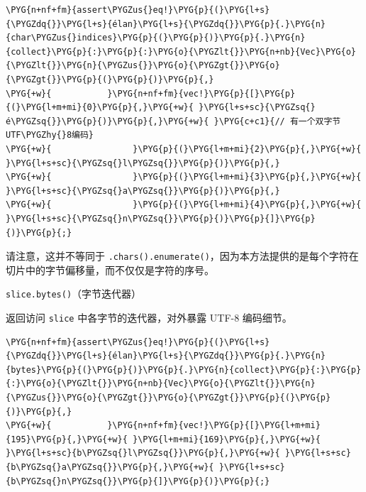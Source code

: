 \begin{Verbatim}[commandchars=\\\{\},breaklines=true,breakanywhere=true,fontsize=\codefont,xleftmargin=17bp]
\PYG{n+nf+fm}{assert\PYGZus{}eq!}\PYG{p}{(}\PYG{l+s}{\PYGZdq{}}\PYG{l+s}{élan}\PYG{l+s}{\PYGZdq{}}\PYG{p}{.}\PYG{n}{char\PYGZus{}indices}\PYG{p}{(}\PYG{p}{)}\PYG{p}{.}\PYG{n}{collect}\PYG{p}{:}\PYG{p}{:}\PYG{o}{\PYGZlt{}}\PYG{n+nb}{Vec}\PYG{o}{\PYGZlt{}}\PYG{n}{\PYGZus{}}\PYG{o}{\PYGZgt{}}\PYG{o}{\PYGZgt{}}\PYG{p}{(}\PYG{p}{)}\PYG{p}{,}
\PYG{+w}{           }\PYG{n+nf+fm}{vec!}\PYG{p}{[}\PYG{p}{(}\PYG{l+m+mi}{0}\PYG{p}{,}\PYG{+w}{ }\PYG{l+s+sc}{\PYGZsq{}é\PYGZsq{}}\PYG{p}{)}\PYG{p}{,}\PYG{+w}{ }\PYG{c+c1}{// 有一个双字节UTF\PYGZhy{}8编码}
\PYG{+w}{                }\PYG{p}{(}\PYG{l+m+mi}{2}\PYG{p}{,}\PYG{+w}{ }\PYG{l+s+sc}{\PYGZsq{}l\PYGZsq{}}\PYG{p}{)}\PYG{p}{,}
\PYG{+w}{                }\PYG{p}{(}\PYG{l+m+mi}{3}\PYG{p}{,}\PYG{+w}{ }\PYG{l+s+sc}{\PYGZsq{}a\PYGZsq{}}\PYG{p}{)}\PYG{p}{,}
\PYG{+w}{                }\PYG{p}{(}\PYG{l+m+mi}{4}\PYG{p}{,}\PYG{+w}{ }\PYG{l+s+sc}{\PYGZsq{}n\PYGZsq{}}\PYG{p}{)}\PYG{p}{]}\PYG{p}{)}\PYG{p}{;}
\end{Verbatim}

请注意，这并不等同于 \texttt{.chars().enumerate()}，因为本方法提供的是每个字符在切片中的字节偏移量，而不仅仅是字符的序号。

\begin{mySidenote}
\texttt{slice.bytes()}（字节迭代器）
\end{mySidenote}

返回访问 \texttt{slice} 中各字节的迭代器，对外暴露 UTF-8 编码细节。

\begin{Verbatim}[commandchars=\\\{\},breaklines=true,breakanywhere=true,fontsize=\codefont,xleftmargin=17bp]
\PYG{n+nf+fm}{assert\PYGZus{}eq!}\PYG{p}{(}\PYG{l+s}{\PYGZdq{}}\PYG{l+s}{élan}\PYG{l+s}{\PYGZdq{}}\PYG{p}{.}\PYG{n}{bytes}\PYG{p}{(}\PYG{p}{)}\PYG{p}{.}\PYG{n}{collect}\PYG{p}{:}\PYG{p}{:}\PYG{o}{\PYGZlt{}}\PYG{n+nb}{Vec}\PYG{o}{\PYGZlt{}}\PYG{n}{\PYGZus{}}\PYG{o}{\PYGZgt{}}\PYG{o}{\PYGZgt{}}\PYG{p}{(}\PYG{p}{)}\PYG{p}{,}
\PYG{+w}{           }\PYG{n+nf+fm}{vec!}\PYG{p}{[}\PYG{l+m+mi}{195}\PYG{p}{,}\PYG{+w}{ }\PYG{l+m+mi}{169}\PYG{p}{,}\PYG{+w}{ }\PYG{l+s+sc}{b\PYGZsq{}l\PYGZsq{}}\PYG{p}{,}\PYG{+w}{ }\PYG{l+s+sc}{b\PYGZsq{}a\PYGZsq{}}\PYG{p}{,}\PYG{+w}{ }\PYG{l+s+sc}{b\PYGZsq{}n\PYGZsq{}}\PYG{p}{]}\PYG{p}{)}\PYG{p}{;}
\end{Verbatim}

